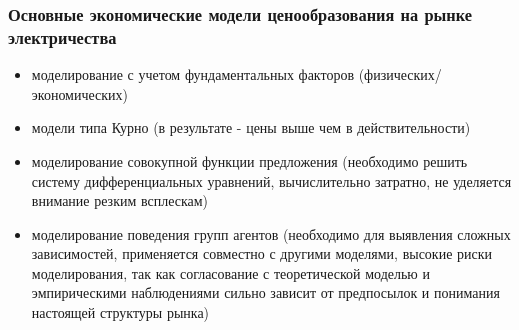 \documentclass[c, dvipsnames]{beamer}  %
\begin{document}
\begin{frame}[shrink=5]
\frametitle{Основные экономические модели ценообразования на рынке электричества} 


\begin{itemize}
		\item  моделирование с учетом фундаментальных факторов (физических/экономических)
	\item модели типа Курно (в результате - цены выше чем в действительности)
	\item моделирование совокупной функции предложения (необходимо решить систему дифференциальных уравнений, вычислительно затратно, не уделяется внимание резким всплескам) 
	\item  моделирование поведения групп агентов  (необходимо для выявления сложных зависимостей, применяется совместно с другими моделями, высокие риски моделирования, так как согласование с теоретической моделью  и эмпирическими наблюдениями сильно зависит от предпосылок и понимания настоящей структуры рынка)

\end{itemize}

\end{frame}
\end{document}
